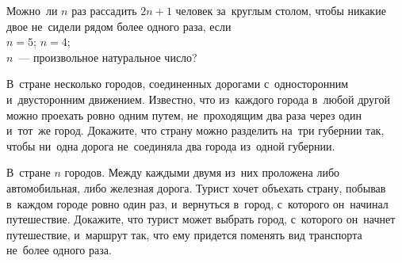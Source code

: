 \begin{problems}
\item
Можно~ли $n$ раз рассадить $2 n + 1$ человек за~круглым столом, чтобы никакие
двое не~сидели рядом более одного раза, если
\\
\sp $n = 5$;
\quad
\sp $n = 4$;
\\
\sp $n$~--- произвольное натуральное число?

\item
В~стране несколько городов, соединенных дорогами с~односторонним и~двусторонним
движением.
Известно, что из~каждого города в~любой другой можно проехать ровно одним
путем, не~проходящим два раза через один и~тот~же город.
Докажите, что страну можно разделить на~три губернии так, чтобы ни~одна дорога
не~соединяла два города из~одной губернии.

\item
В~стране $n$ городов.
Между каждыми двумя из~них проложена либо автомобильная, либо железная дорога.
Турист хочет объехать страну, побывав в~каждом городе ровно один раз,
и~вернуться в~город, с~которого он~начинал путешествие.
Докажите, что турист может выбрать город, с~которого он~начнет путешествие,
и~маршрут так, что ему придется поменять вид транспорта не~более одного раза.

\end{problems}

